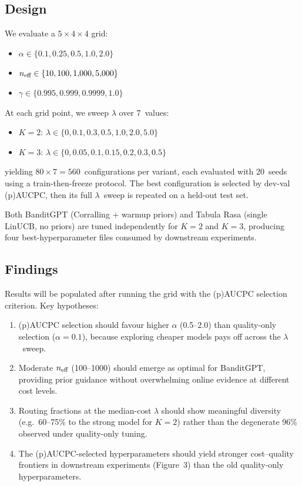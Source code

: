 \subsection{Design}
\label{appendix:alpha_neff_design}

We evaluate a $5 \times 4 \times 4$ grid:
\begin{itemize}[leftmargin=*,noitemsep]
    \item $\alpha \in \{0.1, 0.25, 0.5, 1.0, 2.0\}$
    \item $n_{\text{eff}} \in \{10, 100, 1{,}000, 5{,}000\}$
    \item $\gamma \in \{0.995, 0.999, 0.9999, 1.0\}$
\end{itemize}
At each grid point, we sweep $\lambda$ over 7~values:
\begin{itemize}[leftmargin=*,noitemsep]
    \item $K{=}2$: $\lambda \in \{0, 0.1, 0.3, 0.5, 1.0, 2.0, 5.0\}$
    \item $K{=}3$: $\lambda \in \{0, 0.05, 0.1, 0.15, 0.2, 0.3, 0.5\}$
\end{itemize}
yielding $80 \times 7 = 560$~configurations per variant, each evaluated
with 20~seeds using a train-then-freeze protocol.  The best
configuration is selected by dev-val (p)AUCPC, then its full
$\lambda$~sweep is repeated on a held-out test set.

Both BanditGPT (Corralling + warmup priors) and Tabula Rasa (single
LinUCB, no priors) are tuned independently for $K{=}2$ and $K{=}3$,
producing four best-hyperparameter files consumed by downstream
experiments.



\subsection{Findings}
\label{appendix:alpha_neff_findings}

Results will be populated after running the grid with the (p)AUCPC
selection criterion.  Key hypotheses:

\begin{enumerate}[leftmargin=*,noitemsep]
    \item (p)AUCPC selection should favour higher $\alpha$
          (0.5--2.0) than quality-only selection ($\alpha{=}0.1$),
          because exploring cheaper models pays off across the
          $\lambda$~sweep.
    \item Moderate $n_{\text{eff}}$ (100--1000) should emerge as optimal for
          BanditGPT, providing prior guidance without overwhelming
          online evidence at different cost levels.
    \item Routing fractions at the median-cost $\lambda$ should show
          meaningful diversity (e.g.\ 60--75\% to the strong model for
          $K{=}2$) rather than the degenerate 96\% observed under
          quality-only tuning.
    \item The (p)AUCPC-selected hyperparameters should yield stronger
          cost--quality frontiers in downstream experiments (Figure~3)
          than the old quality-only hyperparameters.
\end{enumerate}

